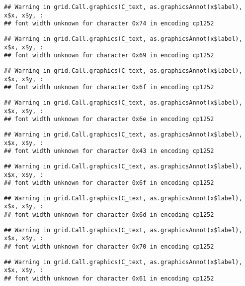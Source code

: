 \documentclass[
]{article}
\begin{document}
\begin{verbatim}
## Warning in grid.Call.graphics(C_text, as.graphicsAnnot(x$label), x$x, x$y, :
## font width unknown for character 0x74 in encoding cp1252
\end{verbatim}

\begin{verbatim}
## Warning in grid.Call.graphics(C_text, as.graphicsAnnot(x$label), x$x, x$y, :
## font width unknown for character 0x69 in encoding cp1252
\end{verbatim}

\begin{verbatim}
## Warning in grid.Call.graphics(C_text, as.graphicsAnnot(x$label), x$x, x$y, :
## font width unknown for character 0x6f in encoding cp1252
\end{verbatim}

\begin{verbatim}
## Warning in grid.Call.graphics(C_text, as.graphicsAnnot(x$label), x$x, x$y, :
## font width unknown for character 0x6e in encoding cp1252
\end{verbatim}

\begin{verbatim}
## Warning in grid.Call.graphics(C_text, as.graphicsAnnot(x$label), x$x, x$y, :
## font width unknown for character 0x43 in encoding cp1252
\end{verbatim}

\begin{verbatim}
## Warning in grid.Call.graphics(C_text, as.graphicsAnnot(x$label), x$x, x$y, :
## font width unknown for character 0x6f in encoding cp1252
\end{verbatim}

\begin{verbatim}
## Warning in grid.Call.graphics(C_text, as.graphicsAnnot(x$label), x$x, x$y, :
## font width unknown for character 0x6d in encoding cp1252
\end{verbatim}

\begin{verbatim}
## Warning in grid.Call.graphics(C_text, as.graphicsAnnot(x$label), x$x, x$y, :
## font width unknown for character 0x70 in encoding cp1252
\end{verbatim}

\begin{verbatim}
## Warning in grid.Call.graphics(C_text, as.graphicsAnnot(x$label), x$x, x$y, :
## font width unknown for character 0x61 in encoding cp1252
\end{verbatim}
\end{document}
